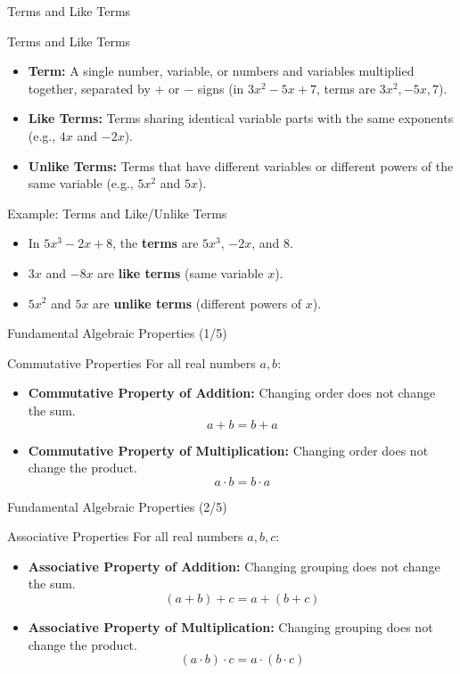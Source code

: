 \begin{frame}{Terms and Like Terms}
\begin{defn}{Terms and Like Terms}{}
\begin{itemize}
\item \textbf{Term:} A single number, variable, or numbers and variables multiplied together, separated by $+$ or $-$ signs (in $3x^2 - 5x + 7$, terms are $3x^2, -5x, 7$).
\item \textbf{Like Terms:} Terms sharing identical variable parts with the same exponents (e.g., $4x$ and $-2x$).
\item \textbf{Unlike Terms:} Terms that have different variables or different powers of the same variable (e.g., $5x^2$ and $5x$).
\end{itemize}
\end{defn}
\end{frame}

\begin{frame}{Example: Terms and Like/Unlike Terms}
\begin{ex}
\begin{itemize}
\item In $5x^3 - 2x + 8$, the \textbf{terms} are $5x^3$, $-2x$, and $8$.
\item $3x$ and $-8x$ are \textbf{like terms} (same variable $x$).
\item $5x^2$ and $5x$ are \textbf{unlike terms} (different powers of $x$).
\end{itemize}
\end{ex}
\end{frame}

\begin{frame}{Fundamental Algebraic Properties (1/5)}
\begin{prop}{Commutative Properties}{}
For all real numbers $a, b$:
\begin{itemize}
\item \textbf{Commutative Property of Addition:} Changing order does not change the sum.
\[ a + b = b + a \]
\item \textbf{Commutative Property of Multiplication:} Changing order does not change the product.
\[ a \cdot b = b \cdot a \]
\end{itemize}
\end{prop}
\end{frame}

\begin{frame}{Fundamental Algebraic Properties (2/5)}
\begin{prop}{Associative Properties}{}
For all real numbers $a, b, c$:
\begin{itemize}
\item \textbf{Associative Property of Addition:} Changing grouping does not change the sum.
\[ (a + b) + c = a + (b + c) \]
\item \textbf{Associative Property of Multiplication:} Changing grouping does not change the product.
\[ (a \cdot b) \cdot c = a \cdot (b \cdot c) \]
\end{itemize}
\end{prop}
\end{frame}

